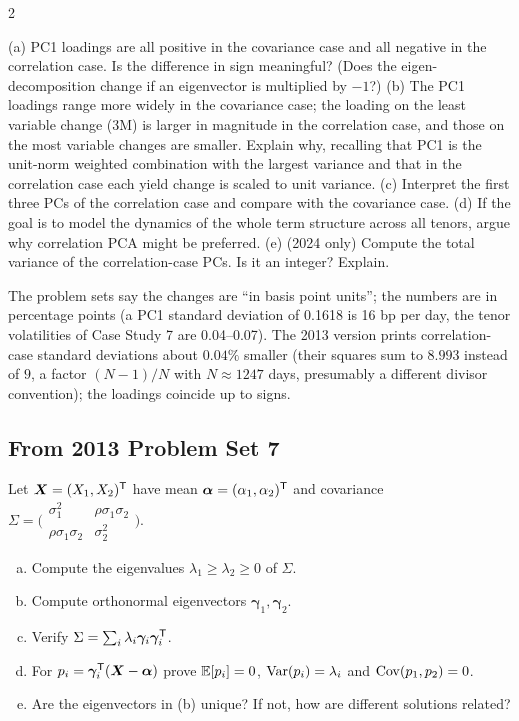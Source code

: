 \begin{paracol}{2}
\begin{exercise}
(a) PC1 loadings are all positive in the covariance case and all negative in the correlation case. Is the
difference in sign meaningful? (Does the eigen-decomposition change if an eigenvector is multiplied by $-1$?)
(b) The PC1 loadings range more widely in the covariance case; the loading on the least variable change (3M) is
larger in magnitude in the correlation case, and those on the most variable changes are smaller. Explain why,
recalling that PC1 is the unit-norm weighted combination with the largest variance and that in the correlation
case each yield change is scaled to unit variance.
(c) Interpret the first three PCs of the correlation case and compare with the covariance case.
(d) If the goal is to model the dynamics of the whole term structure across all tenors, argue why correlation PCA
might be preferred.
(e) (2024 only) Compute the total variance of the correlation-case PCs. Is it an integer? Explain.
\end{exercise}

\begin{coursenote}
The problem sets say the changes are ``in basis point units''; the numbers are in percentage points (a PC1
standard deviation of 0.1618 is 16 bp per day, the tenor volatilities of Case Study 7 are 0.04--0.07). The 2013
version prints correlation-case standard deviations about $0.04\%$ smaller (their squares sum to $8.993$ instead of
$9$, a factor $(N-1)/N$ with $N\approx1247$ days, presumably a different divisor convention); the loadings coincide up
to signs.
\end{coursenote}

\subsection*{From 2013 Problem Set 7}

\begin{exercise}\label{ch07:ex-ps7-1}
Let $\bm X=(X_1,X_2)^{\mathsf T}$ have mean $\bm\alpha=(\alpha_1,\alpha_2)^{\mathsf T}$ and covariance
$\Sigma=\bigl(\begin{smallmatrix}\sigma_1^2&\rho\sigma_1\sigma_2\\ \rho\sigma_1\sigma_2&\sigma_2^2\end{smallmatrix}\bigr)$.
\begin{enumerate}[(a)]
  \item Compute the eigenvalues $\lambda_1\ge\lambda_2\ge0$ of $\Sigma$.
  \item Compute orthonormal eigenvectors $\bm\gamma_1,\bm\gamma_2$.
  \item Verify $\Sigma=\sum_i\lambda_i\bm\gamma_i\bm\gamma_i^{\mathsf T}$.
  \item For $p_i=\bm\gamma_i^{\mathsf T}(\bm X-\bm\alpha)$ prove $\mathbb{E}[p_i]=0$, $\operatorname{Var}(p_i)=\lambda_i$ and $\operatorname{Cov}(p_1,p_2)=0$.
  \item Are the eigenvectors in (b) unique? If not, how are different solutions related?
\end{enumerate}
\end{exercise}


\end{paracol}
